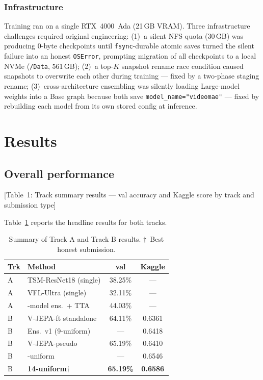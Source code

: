 \documentclass[10pt,twocolumn,letterpaper]{article}
\begin{document}
\subsubsection{Infrastructure}
\label{sec:infra}

Training ran on a single RTX~4000~Ada (21\,GB VRAM).  Three
infrastructure challenges required original engineering:
(1)~a silent NFS quota (30\,GB) was producing 0-byte checkpoints until
\texttt{fsync}-durable atomic saves turned the silent failure into an
honest \texttt{OSError}, prompting migration of all checkpoints to a
local NVMe (\texttt{/Data}, 561\,GB);
(2)~a top-$K$ snapshot rename race condition caused snapshots to
overwrite each other during training — fixed by a two-phase staging
rename;
(3)~cross-architecture ensembling was silently loading Large-model
weights into a Base graph because both save \texttt{model\_name="videomae"}
— fixed by rebuilding each model from its own stored config at inference.

\section{Results}
\label{sec:results}

\subsection{Overall performance}

[Table~1: Track summary results — val accuracy and Kaggle score by
track and submission type]

Table~\ref{tab:main} reports the headline results for both tracks.

\begin{table}[!t]
\centering
\caption{Summary of Track A and Track B results.
  $\dagger$~Best honest submission.}
\label{tab:main}
\setlength{\tabcolsep}{4pt}
\small
\begin{tabular}{l>{\raggedright\arraybackslash}p{3.2cm}cc}
\toprule
\textbf{Trk} & \textbf{Method} & \textbf{val} & \textbf{Kaggle}\\
\midrule
A & TSM-ResNet18 (single) & 38.25\% & — \\
A & VFL-Ultra (single) & 32.11\% & — \\
A & 3-model ens.\ + TTA & 44.03\% & — \\
\midrule
B & V-JEPA-ft standalone & 64.11\% & 0.6361 \\
B & Ens.\ v1 (9-uniform) & — & 0.6418 \\
B & V-JEPA-pseudo & 65.19\% & 0.6410 \\
B & 12-uniform & — & 0.6546 \\
B & \textbf{14-uniform}$\dagger$ & \textbf{65.19\%} & \textbf{0.6586} \\
\bottomrule
\end{tabular}
\end{table}
\end{document}
